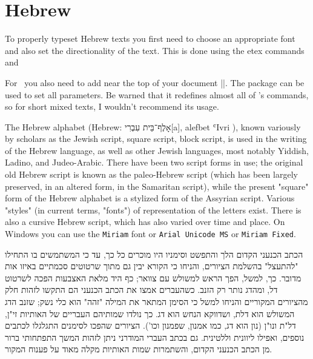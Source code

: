 \section{Hebrew}
\label{s:hebrew}



To properly typeset Hebrew texts you first need to choose an appropriate font and also set the directionality of the text. This
is done using the etex commands  and  

For \XeTeX\ you also need to add near the top of your document ||. The package  can be used to set all parameters. Be warned that it redefines almost all of \latexe's commands, so for short mixed texts, I wouldn't recommend its usage. 



The Hebrew alphabet (Hebrew: אָלֶף־בֵּית עִבְרִי[a], alefbet ʿIvri ), known variously by scholars as the Jewish script, square script, block script, is used in the writing of the Hebrew language, as well as other Jewish languages, most notably Yiddish, Ladino, and Judeo-Arabic. There have been two script forms in use; the original old Hebrew script is known as the paleo-Hebrew script (which has been largely preserved, in an altered form, in the Samaritan script), while the present "square" form of the Hebrew alphabet is a stylized form of the Assyrian script. Various "styles" (in current terms, "fonts") of representation of the letters exist. There is also a cursive Hebrew script, which has also varied over time and place. On Windows you can use the \texttt{Miriam} font or \texttt{Arial Unicode MS} or \texttt{Miriam Fixed}.
\medskip

\topline
\bgroup
\ifxetex{}\fi
\raggedleft\arial{}\beginR

הכתב הכנעני הקדום הלך והתפשט וסימניו היו מוכרים כל כך, עד כי המשתמשים בו התחילו "להתעצל" בהשלמת הציורים, והניחו כי הקורא יבין גם מתוך שרטוטים סכמתיים באיזו אות מדובר. כך, למשל, הפך הראש למשולש עם צוואר; כף היד מלאת האצבעות הפכה לשרטוט דל, ומהדג נותר רק הזנב. כשהעברים אמצו את הכתב הכנעני הם התקשו לזהות חלק מהציורים המקוריים והניחו למשל כי הסימן המתאר את המילה "זהה" הוא כלי נשק; שזנב הדג המשולש הוא דלת, ושדווקא הנחש הוא דג. כך נולדו שמותיהם העבריים של האותיות זי"ן, דל"ת ונו"ן (נון הוא דג, כמו אמנון, שפמנון וכו'). הציורים שהפכו לסימנים התגלגלו לכתבים נוספים, ואפילו ליוונית וללטינית. גם בכתב העברי המודרני ניתן לזהות המשך התפתחותי ברור מן הכתב הכנעני הקדום, והשתמרות שמות האותיות מקלה מאוד על פענוח המקור.


